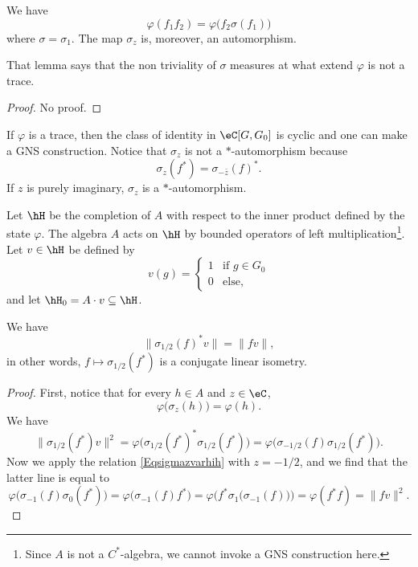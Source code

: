 \begin{lemma}
	We have
	\begin{equation}
		\varphi(f_1f_2)=\varphi\big( f_2\sigma(f_1) \big)
	\end{equation}
	where $\sigma=\sigma_1$. The map $\sigma_z$ is, moreover, an automorphism.
\end{lemma}
That lemma says that the non triviality of $\sigma$ measures at what extend $\varphi$ is not a trace.

\begin{proof}
	No proof.
\end{proof}
If $\varphi$ is a trace, then the class of identity in $\eC[G,G_0]$ is cyclic and one can make a GNS construction. Notice that $\sigma_z$ is not a $*$-automorphism because
\begin{equation}
	\sigma_z(f^*)=\sigma_{-\bar z}(f)^*.
\end{equation}
If $z$ is purely imaginary, $\sigma_z$ is a $*$-automorphism.

Let $\hH$ be the completion of $A$ with respect to the inner product defined by the state $\varphi$. The algebra $A$ acts on $\hH$ by bounded operators of left multiplication\footnote{Since $A$ is not a $C^*$-algebra, we cannot invoke a GNS construction here.}. Let $v\in\hH$ be defined by
\begin{equation}
	v(g)=
	\begin{cases}
		1 & \text{if }g\in G_0 \\
		0 & \text{else},
	\end{cases}
\end{equation}
and let $\hH_0=A\cdot v\subseteq\hH$.


\begin{lemma}
	We have
	\begin{equation}
		\| \sigma_{1/2}(f)^*v \|=\| fv \|,
	\end{equation}
	in other words, $f\mapsto \sigma_{1/2}(f^*)$ is a conjugate linear isometry.
\end{lemma}

\begin{proof}
	First, notice that for every $h\in A$ and $z\in \eC$,
	\begin{equation}		\label{Eqsigmazvarhih}
		\varphi\big( \sigma_z(h) \big)=\varphi(h).
	\end{equation}
	We have
	\begin{equation}
		\| \sigma_{1/2}(f^*)v \|^2=\varphi\big( \sigma_{1/2}(f^*)^*\sigma_{1/2}(f^*) \big)=\varphi\big( \sigma_{-1/2}(f)\sigma_{1/2}(f^*) \big).
	\end{equation}
	Now we apply the relation \eqref{Eqsigmazvarhih} with $z=-1/2$, and we find that the latter line is equal to
	\begin{equation}
		\varphi\big( \sigma_{-1}(f)\sigma_0(f^*) \big)=\varphi\big( \sigma_{-1}(f)f^* \big)=\varphi\Big( f^*\sigma_1\big( \sigma_{-1}(f) \big) \Big)=\varphi(f^*f)=\| fv \|^2.
	\end{equation}
\end{proof}

